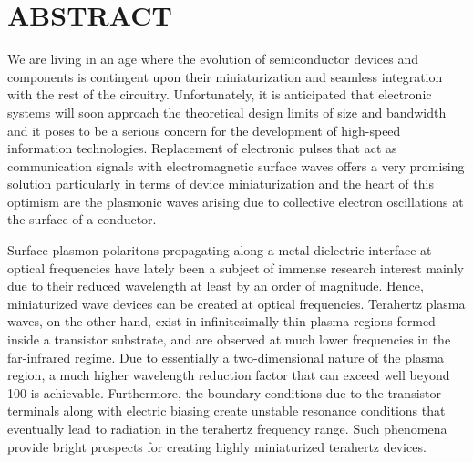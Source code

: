 %
%
%

\chapter*{ABSTRACT}

\pagestyle{plain} %
\setcounter{page}{2}

\indent We are living in an age where the evolution of semiconductor devices and components is contingent upon their miniaturization and seamless integration  with the rest of the circuitry. Unfortunately, it is anticipated that electronic systems will soon approach the theoretical design limits of size and bandwidth and it poses to be a serious concern for the development of high-speed information technologies. Replacement of electronic pulses that act as communication signals with electromagnetic surface waves offers a very promising solution particularly in terms of device miniaturization and the heart of this optimism are the plasmonic waves arising due to collective electron oscillations at the surface of a conductor.

Surface plasmon polaritons propagating along a metal-dielectric interface at optical frequencies have lately been a subject of immense research interest mainly due to their reduced wavelength at least by an order of magnitude. Hence, miniaturized wave devices can be created at optical frequencies. Terahertz plasma waves, on the other hand, exist in infinitesimally thin plasma regions formed inside a transistor substrate, and are observed at much lower frequencies in the far-infrared regime. Due to essentially a two-dimensional nature of the plasma region, a much higher wavelength reduction factor that can exceed well beyond 100 is achievable. Furthermore, the boundary conditions due to the transistor terminals along with electric biasing create unstable resonance conditions that eventually lead to radiation in the terahertz frequency range. Such phenomena provide bright prospects for creating highly miniaturized terahertz devices.

